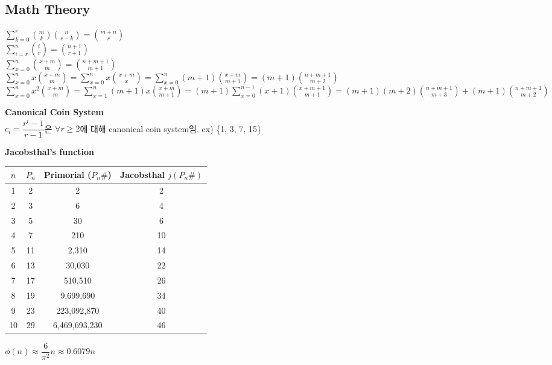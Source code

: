 \subsection{Math Theory}

\noindent
$\displaystyle\sum_{k=0}^{r} \binom{m}{k} \binom{n}{r-k} = \binom{m+n}{r}$ \\ 
$\displaystyle\sum_{i=r}^{n} \binom{i}{r} = \binom{n+1}{r+1}$ \\
$\displaystyle\sum_{x=0}^{n} \binom{x+m}{m} = \binom{n+m+1}{m+1}$ \\ 
$\displaystyle\sum_{x=0}^{n} x \binom{x+m}{m} = \displaystyle\sum_{x=0}^{n} x \binom{x+m}{x} = \displaystyle\sum_{x=0}^{n} (m+1) \binom{x+m}{m+1} = (m+1) \binom{n+m+1}{m+2}$ \\ 
$\displaystyle\sum_{x=0}^{n} x^2 \binom{x+m}{m} = \displaystyle\sum_{x=1}^{n} (m+1)x \binom{x+m}{m+1} = (m+1) \displaystyle\sum_{x=0}^{n-1} (x+1) \binom{x+m+1}{m+1} = (m+1)(m+2) \binom{n+m+1}{m+3} + (m+1) \binom{n+m+1}{m+2}$

\vspace{5pt}
\noindent \textbf{Canonical Coin System} \\
$c_i = \dfrac{r^i - 1}{r - 1}$은 $\forall r \ge 2$에 대해 canonical coin system임. ex) \{1, 3, 7, 15\}

\vspace{5pt}
\noindent \textbf{Jacobsthal's function} \\
\begin{flushleft}
\noindent
\begin{tabular}{|c|c|c|c|}
\hline
$n$ & $P_n$ & Primorial ($P_n\#$) & Jacobsthal $j(P_n\#)$ \\ \hline
1 & 2 & 2 & 2 \\ \hline
2 & 3 & 6 & 4 \\ \hline
3 & 5 & 30 & 6 \\ \hline
4 & 7 & 210 & 10 \\ \hline
5 & 11 & 2,310 & 14 \\ \hline
6 & 13 & 30,030 & 22 \\ \hline
7 & 17 & 510,510 & 26 \\ \hline
8 & 19 & 9,699,690 & 34 \\ \hline
9 & 23 & 223,092,870 & 40 \\ \hline
10 & 29 & 6,469,693,230 & 46 \\ \hline
\end{tabular}
\end{flushleft}

\vspace{5pt}
\noindent $\phi(n) \approx \dfrac{6}{\pi^2}n \approx 0.6079n$

